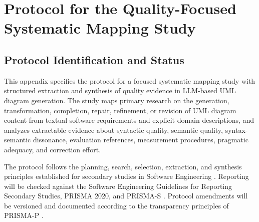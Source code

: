 %

\providecommand{\protocolfield}[1]{\textbf{[#1]}}
\providecommand{\yes}{\textit{Yes}}
\providecommand{\partial}{\textit{Partially}}
\providecommand{\no}{\textit{No}}
\newcommand{\reviewtitle}{Large Language Models for UML Diagram Generation}

\chapter{Protocol for the Quality-Focused Systematic Mapping Study}
\label{app:quality_focused_mapping_protocol}

\section{Protocol Identification and Status}
\label{sec:protocol_identification}

This appendix specifies the protocol for a focused systematic mapping study with structured extraction and synthesis of quality evidence in LLM-based UML diagram generation. The study maps primary research on the generation, transformation, completion, repair, refinement, or revision of UML diagram content from textual software requirements and explicit domain descriptions, and analyzes extractable evidence about syntactic quality, semantic quality, syntax-semantic dissonance, evaluation references, measurement procedures, pragmatic adequacy, and correction effort.

The protocol follows the planning, search, selection, extraction, and synthesis principles established for secondary studies in Software Engineering \cite{Kitchenham2007Guidelines,Brereton2007Lessons,Petersen2015Mapping,Zhang2011Identifying}. Reporting will be checked against the Software Engineering Guidelines for Reporting Secondary Studies, PRISMA 2020, and PRISMA-S \cite{Kitchenham2023SEGRESS,Page2021PRISMA,Rethlefsen2021PRISMAS}. Protocol amendments will be versioned and documented according to the transparency principles of PRISMA-P \cite{Shamseer2015PRISMAP}.

